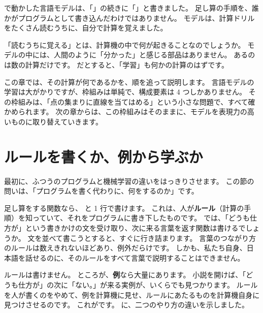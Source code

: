 で動かした言語モデルは、「」の続きに「」と書きました。
足し算の手順を、誰かがプログラムとして書き込んだわけではありません。
モデルは、計算ドリルをたくさん読むうちに、自分で計算を覚えました。

「読むうちに覚える」とは、計算機の中で何が起きることなのでしょうか。
モデルの中には、人間のように「分かった」と感じる部品はありません。
あるのは数の計算だけです。
だとすると、「学習」も何かの計算のはずです。

この章では、その計算が何であるかを、順を追って説明します。
言語モデルの学習は大がかりですが、枠組みは単純で、構成要素は 4 つしかありません。
その枠組みは、「点の集まりに直線を当てはめる」という小さな問題で、すべて確かめられます。
次の章からは、この枠組みはそのままに、モデルを表現力の高いものに取り替えていきます。

\section{ルールを書くか、例から学ぶか}\label{sec:ml-rules-vs-examples}

最初に、ふつうのプログラムと機械学習の違いをはっきりさせます。
この節の問いは、「プログラムを書く代わりに、何をするのか」です。

足し算をする関数なら、 と 1 行で書けます。
これは、人が\textbf{ルール}（計算の手順）を知っていて、それをプログラムに書き下したものです。
では、「どうも仕方が」という書きかけの文を受け取り、次に来る言葉を返す関数は書けるでしょうか。
 文を並べて書こうとすると、すぐに行き詰まります。
言葉のつながり方のルールは数えきれないほどあり、例外だらけです。
しかも、私たち自身、日本語を話せるのに、そのルールをすべて言葉で説明することはできません。

ルールは書けません。
ところが、\textbf{例}なら大量にあります。
小説を開けば、「どうも仕方が」の次に「ない。」が来る実例が、いくらでも見つかります。
ルールを人が書くのをやめて、例を計算機に見せ、ルールにあたるものを計算機自身に見つけさせるのです。
これがです。
に、二つのやり方の違いを示しました。

